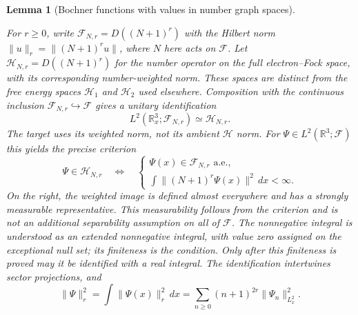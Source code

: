 \documentclass[11pt,a4paper]{article}
\newtheorem{lemma}[theorem]{Lemma}
\theoremstyle{definition}
\theoremstyle{remark}
\newcommand{\proofid}[1]{\par\smallskip{\normalfont\scriptsize\color{inkblue}Stable ID: \nolinkurl{#1}}\par\smallskip}
\begin{document}
\begin{lemma}[Bochner functions with values in number graph spaces]
\label{fock:bochner-graph}
\proofid{fock:bochner-graph}
\par{}\par\smallskip

For $r\geq0$, write $\mathcal F_{N,r}=D((N+1)^r)$ with the Hilbert norm
$\|u\|_r=\|(N+1)^ru\|$, where $N$ here acts on $\mathcal F$.
Let $\mathcal H_{N,r}=D((N+1)^r)$ for the number operator on the
full electron--Fock space, with its corresponding number-weighted norm.
These spaces are distinct from the free energy spaces $\mathcal H_1$
and $\mathcal H_2$ used elsewhere.
Composition with the continuous inclusion $\mathcal F_{N,r}\hookrightarrow
\mathcal F$ gives a unitary identification
\[
 L^2(\mathbb R^3_x;\mathcal F_{N,r})\simeq\mathcal H_{N,r}.
\]
The target uses its weighted norm, not its ambient $\mathcal H$ norm.
For $\Psi\in L^2(\mathbb R^3;\mathcal F)$ this yields the precise criterion
\[
 \Psi\in\mathcal H_{N,r}
 \quad\Longleftrightarrow\quad
 \begin{cases}
  \Psi(x)\in\mathcal F_{N,r}\text{ a.e.},\\
  \displaystyle\int\|(N+1)^r\Psi(x)\|^2\,dx<\infty.
 \end{cases}
\]
On the right, the weighted image is defined almost everywhere and
has a strongly measurable representative. This measurability follows
from the criterion and is not an additional separability assumption
on all of $\mathcal F$. The nonnegative integral is understood as
an extended nonnegative integral, with value zero assigned on the
exceptional null set; its finiteness is the condition. Only after
this finiteness is proved may it be identified with a real integral.
The identification intertwines sector
projections, and
\[
 \|\Psi\|_r^2
   =\int\|\Psi(x)\|_r^2\,dx
   =\sum_{n\geq0}(n+1)^{2r}\|\Psi_n\|_{L^2_x}^2.
\]
\end{lemma}
\end{document}

